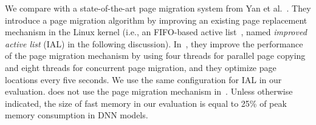 We compare \name with a state-of-the-art page migration system from Yan et al.~\cite{Yan:ASPLOS19}. They introduce a page migration algorithm by improving an existing page replacement mechanism in the Linux kernel (i.e., an FIFO-based active list~\cite{Yan:ASPLOS19}, named \textit{improved active list} (IAL) in the following discussion). In~\cite{Yan:ASPLOS19}, they improve the performance of the page migration mechanism by using four threads for parallel page copying and eight threads for concurrent page migration, and they optimize page locations every five seconds. \textcolor{check}{We use the same configuration for IAL in our evaluation}. \name does not use the page migration mechanism in~\cite{Yan:ASPLOS19}. Unless otherwise indicated, \textcolor{check}{the size of fast memory in our evaluation is equal to 25\% of peak memory consumption in DNN models.}

